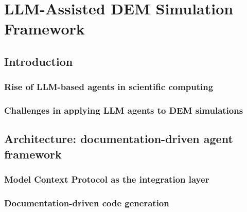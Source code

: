 \documentclass[../main]{subfiles}
\begin{document}
\chapter{LLM-Assisted DEM Simulation Framework}
\label{ch:computational_framework}

\section{Introduction}
\label{sec:ch3_intro}

\subsection{Rise of LLM-based agents in scientific computing}
\label{subsec:ch3_llm_agents}


\subsection{Challenges in applying LLM agents to DEM simulations}
\label{subsec:ch3_challenges}


\section{Architecture: documentation-driven agent framework}
\label{sec:ch3_architecture}

\subsection{Model Context Protocol as the integration layer}
\label{subsec:ch3_mcp}


\subsection{Documentation-driven code generation}
\label{subsec:ch3_docdriven}

\end{document}
